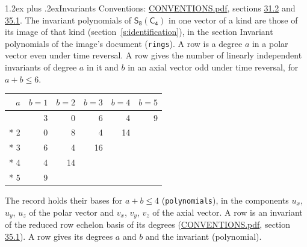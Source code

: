 \documentclass[10pt,a4paper]{article}
\makeatletter
\renewcommand\section{\@startsection{section}{1}{\z@}{-3ex plus -1ex minus -.2ex}%
  {1.2ex plus .2ex}{\normalfont\large\sffamily\bfseries\color{parttitle}}}
\numberwithin{equation}{section}
\newcommand{\grp}[1]{\mathsf{#1}}
\makeatother
\begin{document}
\section{Invariants}\label{s:invariants}
Conventions: \href{../../CONVENTIONS.pdf}{CONVENTIONS.pdf}, sections \href{../../CONVENTIONS.pdf\#conv.31.2}{31.2} and \href{../../CONVENTIONS.pdf\#conv.35.1}{35.1}.
The invariant polynomials of $\grp{S_{8}}(\grp{C_{4}})$ in one vector of a kind are those of its image of that kind (section~\ref{s:identification}), in the section Invariant polynomials of the image's document (\texttt{rings}).
\leavevmode\label{n:index.degree.polar}\label{n:index.degree.axial}A row is a degree $a$ in a polar vector even under time reversal. A row gives the number of linearly independent invariants of degree $a$ in it and $b$ in an axial vector odd under time reversal, for $a + b \le 6$.
{\small\begin{longtable}{@{}rrrrrr@{}}\toprule
$a$ & $b = 1$ & $b = 2$ & $b = 3$ & $b = 4$ & $b = 5$\\\midrule\endhead
\bottomrule\endfoot\endlastfoot
1 & 3 & 0 & 6 & 4 & 9\\*
2 & 0 & 8 & 4 & 14 & \\*
3 & 6 & 4 & 16 &  & \\*
4 & 4 & 14 &  &  & \\*
5 & 9 &  &  &  & \\
\bottomrule\end{longtable}}
\leavevmode\label{n:local.component.polar}\label{n:local.component.axial}The record holds their bases for $a + b \le 4$ (\texttt{polynomials}), in the components $u_{x}$, $u_{y}$, $u_{z}$ of the polar vector and $v_{x}$, $v_{y}$, $v_{z}$ of the axial vector. \label{n:head.polynomial}A row is an invariant of the reduced row echelon basis of its degrees (\href{../../CONVENTIONS.pdf}{CONVENTIONS.pdf}, section \href{../../CONVENTIONS.pdf\#conv.35.1}{35.1}). A row gives its degrees $a$ and $b$ and the invariant (polynomial).
\end{document}
